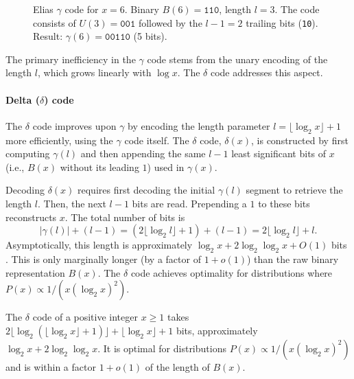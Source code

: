 \begin{figure}[hbtp]
    \centering
    \caption{Elias $\gamma$ code for $x=6$. Binary $B(6)=\texttt{110}$, length $l=3$. The code consists of $U(3)=\texttt{001}$ followed by the $l-1=2$ trailing bits (\texttt{10}). Result: $\gamma(6)=\texttt{00110}$ (5 bits).}
    \label{fig:gamma_code_example}
\end{figure}

\noindent The primary inefficiency in the $\gamma$ code stems from the unary encoding of the length $l$, which grows linearly with $\log x$. The $\delta$ code addresses this aspect.

\paragraph{Delta ($\delta$) code} The $\delta$ code improves upon $\gamma$ by encoding the length parameter $l = \lfloor \log_2 x \rfloor + 1$ more efficiently, using the $\gamma$ code itself. The $\delta$ code, $\delta(x)$, is constructed by first computing $\gamma(l)$ and then appending the same $l-1$ least significant bits of $x$ (i.e., $B(x)$ without its leading $1$) used in $\gamma(x)$.

Decoding $\delta(x)$ requires first decoding the initial $\gamma(l)$ segment to retrieve the length $l$. Then, the next $l-1$ bits are read. Prepending a $1$ to these bits reconstructs $x$. The total number of bits is
\begin{equation*}
    |\gamma(l)| + (l-1) = (2\lfloor \log_2 l \rfloor + 1) + (l-1) = 2\lfloor \log_2 l \rfloor + l.
\end{equation*}
Asymptotically, this length is approximately $\log_2 x + 2\log_2 \log_2 x + O(1)$ bits \cite{witten1999managing}. This is only marginally longer (by a factor of $1+o(1)$) than the raw binary representation $B(x)$. The $\delta$ code achieves optimality for distributions where $P(x) \propto 1/(x(\log_2 x)^2)$.

\begin{theorem}
    The $\delta$ code of a positive integer $x \ge 1$ takes $2\lfloor \log_2 (\lfloor \log_2 x \rfloor + 1) \rfloor + \lfloor \log_2 x \rfloor + 1$ bits, approximately $\log_2 x + 2\log_2 \log_2 x$. It is optimal for distributions $P(x) \propto 1/(x(\log_2 x)^2)$ and is within a factor $1+o(1)$ of the length of $B(x)$.
\end{theorem}

